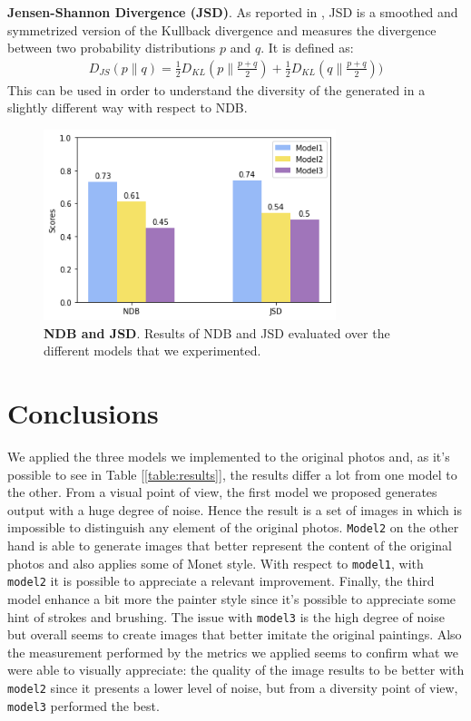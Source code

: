 \documentclass[10pt,twocolumn,letterpaper]{article}
\begin{document}
\textbf{Jensen-Shannon Divergence (JSD)}. As reported in \cite{jsd}, JSD is a smoothed and symmetrized version of the Kullback divergence and measures the divergence between two probability distributions $p$ and $q$. It is defined as: 
\begin{equation}
	\begin{split}
		D_{JS}(p\|q) = \frac{1}{2}D_{KL}(p\|\frac{p+q}{2})+  \frac{1}{2}D_{KL}(q\|\frac{p+q}{2}))
	\end{split}
\end{equation}
This can be used in order to understand the diversity of the generated in a slightly different way with respect to NDB.


\begin{figure}
	\includegraphics[width=23em]{index.png}
	\caption{\textbf{NDB and JSD}. Results of NDB and JSD evaluated over the different models that we experimented.}
	\label{figure:ndb-jsd}
\end{figure}

\section{Conclusions}
We applied the three models we implemented to the original photos and, as it's possible to see in Table [\ref{table:results}], the results differ a lot from one model to the other. From a visual point of view, the first model we proposed generates output with a huge degree of noise. Hence the result is a set of images in which is impossible to distinguish any element of the original photos. \texttt{Model2} on the other hand is able to generate images that better represent the content of the original photos and also applies some of Monet style. With respect to \texttt{model1}, with \texttt{model2} it is possible to appreciate a relevant improvement. Finally, the third model enhance a bit more the painter style since it's possible to appreciate some hint of strokes and brushing. The issue with \texttt{model3} is the high degree of noise but overall seems to create images that better imitate the original paintings. Also the measurement performed by the metrics we applied seems to confirm what we were able to visually appreciate: the quality of the image results to be better with \texttt{model2} since it presents a lower level of noise, but from a diversity point of view, \texttt{model3} performed the best.

{\small


}
\end{document}
